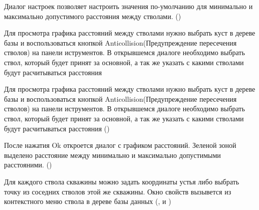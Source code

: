 Диалог настроек позволяет настроить значения по-умолчанию для минимально и максимально допустимого расстояния между стволами.
()


Для просмотра графика расстояний между стволами нужно выбрать куст в дереве базы и воспользоваться кнопкой Anticollision(Предупреждение пересечения стволов) на панели иструментов.
В открывшемся диалоге необходимо выбрать ствол, который будет принят за основной, а так же указать с какими стволами будут расчитываться расстояния

Для просмотра графика расстояний между стволами нужно выбрать куст в дереве базы и воспользоваться кнопкой Anticollision(Предупреждение пересечения стволов) на панели иструментов.
В открывшемся диалоге необходимо выбрать ствол, который будет принят за основной, а так же указать с какими стволами будут расчитываться расстояния
()


После нажатия Ok откроется диалог с графиком расстояний. Зеленой зоной выделено расстояние между минимально и максимально допустимыми расстояними.
()


Для каждого ствола скважины можно задать координаты устья либо выбрать точку из соседних стволов этой же скважины. Окно свойств вызывется из контекстного меню ствола в дереве базы данных
(,  и )

